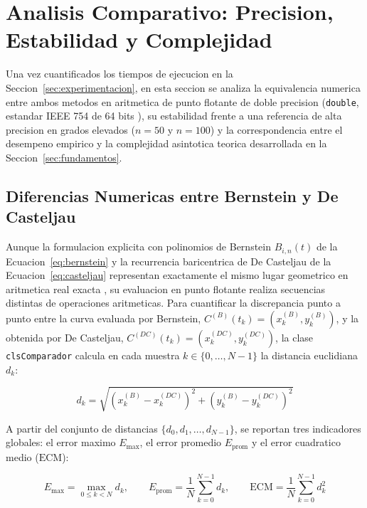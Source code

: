 \section{Analisis Comparativo: Precision, Estabilidad y Complejidad}
\label{sec:comparacion}

Una vez cuantificados los tiempos de ejecucion en la Seccion~\ref{sec:experimentacion}, en esta seccion se analiza la equivalencia numerica entre ambos metodos en aritmetica de punto flotante de doble precision (\texttt{double}, estandar IEEE 754 de 64 bits \cite{ieee754}), su estabilidad frente a una referencia de alta precision en grados elevados ($n = 50$ y $n = 100$) y la correspondencia entre el desempeno empirico y la complejidad asintotica teorica desarrollada en la Seccion~\ref{sec:fundamentos}.

\subsection{Diferencias Numericas entre Bernstein y De Casteljau}
\label{subsec:comp_diferencias}

Aunque la formulacion explicita con polinomios de Bernstein $B_{i,n}(t)$ de la Ecuacion~\ref{eq:bernstein} y la recurrencia baricentrica de De Casteljau de la Ecuacion~\ref{eq:casteljau} representan exactamente el mismo lugar geometrico en aritmetica real exacta \cite{farin2002,piegl1997}, su evaluacion en punto flotante realiza secuencias distintas de operaciones aritmeticas. Para cuantificar la discrepancia punto a punto entre la curva evaluada por Bernstein, $C^{(B)}(t_k) = (x_k^{(B)}, y_k^{(B)})$, y la obtenida por De Casteljau, $C^{(DC)}(t_k) = (x_k^{(DC)}, y_k^{(DC)})$, la clase \texttt{clsComparador} calcula en cada muestra $k \in \{0, \dots, N-1\}$ la distancia euclidiana $d_k$:

\begin{equation}
\label{eq:comp_distancia}
d_k = \sqrt{\left(x_k^{(B)} - x_k^{(DC)}\right)^2 + \left(y_k^{(B)} - y_k^{(DC)}\right)^2}
\end{equation}

A partir del conjunto de distancias $\{d_0, d_1, \dots, d_{N-1}\}$, se reportan tres indicadores globales: el error maximo $E_{\max}$, el error promedio $E_{\text{prom}}$ y el error cuadratico medio ($\text{ECM}$):

\begin{equation}
\label{eq:comp_metricas}
E_{\max} = \max_{0 \le k < N} d_k, \qquad E_{\text{prom}} = \frac{1}{N} \sum_{k=0}^{N-1} d_k, \qquad \text{ECM} = \frac{1}{N} \sum_{k=0}^{N-1} d_k^2
\end{equation}

